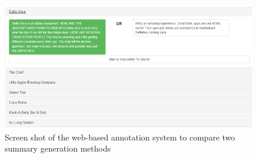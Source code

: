 
\begin{figure}[t]
  \centering
  \includegraphics{figures/comp_judge_scrnshot.eps}
  \caption{Screen shot of the web-based annotation system to compare two summary generation methods}
  \label{fig:comp_judge_scrnshot}
\end{figure}


